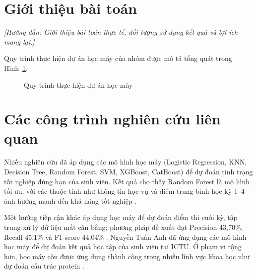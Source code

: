 \documentclass[12pt,a4paper,oneside]{report}
\newcommand{\huongdan}[1]{{\color{guide}\itshape [Hướng dẫn: #1]}}
\begin{document}
\section{Giới thiệu bài toán}
\huongdan{Giới thiệu bài toán thực tế, đối tượng sử dụng kết quả và lợi ích
mang lại.}

Quy trình thực hiện dự án học máy của nhóm được mô tả tổng quát trong
Hình~\ref{fig:quytrinh}.

\begin{figure}[H]
  \centering
  \caption{Quy trình thực hiện dự án học máy}
  \label{fig:quytrinh}
\end{figure}

\section{Các công trình nghiên cứu liên quan}

Nhiều nghiên cứu đã áp dụng các mô hình học máy (Logistic Regression, KNN,
Decision Tree, Random Forest, SVM, XGBoost, CatBoost) để dự đoán tình trạng
tốt nghiệp đúng hạn của sinh viên. Kết quả cho thấy Random Forest là mô hình
tối ưu, với các thuộc tính như thông tin học vụ và điểm trung bình học kỳ
1--4 ảnh hưởng mạnh đến khả năng tốt nghiệp \cite{hai2017,thuan2022,thuy2023}.

Một hướng tiếp cận khác áp dụng học máy để dự đoán điểm thi cuối kỳ, tập
trung xử lý dữ liệu mất cân bằng; phương pháp đề xuất đạt Precision 43,70\%,
Recall 45,1\% và F1-score 44,04\% \cite{lananh}. Nguyễn Tuấn Anh
\cite{tuananh2024} đã ứng dụng các mô hình học máy để dự đoán kết quả học
tập của sinh viên tại ICTU. Ở phạm vi rộng hơn, học máy còn được ứng dụng
thành công trong nhiều lĩnh vực khoa học như dự đoán cấu trúc protein
\cite{alquraishi2021}.
\end{document}
